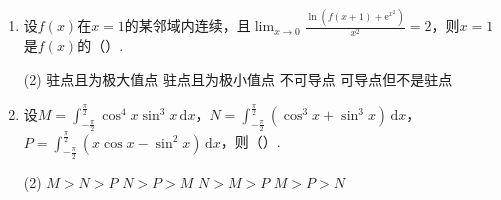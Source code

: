 \documentclass[../main.tex]{subfiles}
\begin{document}
\begin{enumerate}
          \begin{tasks}[label=\textbf{\Alph*.}, label-width=1.5em, column-sep=1em](2)
              \task $1$
              \task $2$
              \task $3$
              \task $0$
          \end{tasks}

    \item 设$f(x)$在$x=1$的某邻域内连续，且$\lim_{x\to0}\frac{\ln\left(f(x+1)+\mathrm{e}^{x^2}\right)}{x^{2}}
              =2$，则$x=1$是$f(x)$的（\qquad）.

          \begin{tasks}[label=\textbf{\Alph*.}, label-width=1.5em, column-sep=1em](2)
              \task 驻点且为极大值点
              \task 驻点且为极小值点
              \task 不可导点
              \task 可导点但不是驻点
          \end{tasks}

    \item 设$M=\int_{-\frac{\pi}{2}}^{\frac{\pi}{2}}\cos^{4} x\sin^{3} x\,\mathrm{d}
              x$，$N=\int_{-\frac{\pi}{2}}^{\frac{\pi}{2}}\left(\cos^{3} x+\sin^{3} x\right
              )\,\mathrm{d}x$，$P=\int_{-\frac{\pi}{2}}^{\frac{\pi}{2}}\left(x\cos x-\sin^{2}
              x\right)\,\mathrm{d}x$，则（\qquad）.

          \begin{tasks}[label=\textbf{\Alph*.}, label-width=1.5em, column-sep=1em](2)
              \task $M>N>P$
              \task $N>P>M$
              \task $N>M>P$
              \task $M>P>N$
          \end{tasks}
\end{enumerate}
\end{document}
